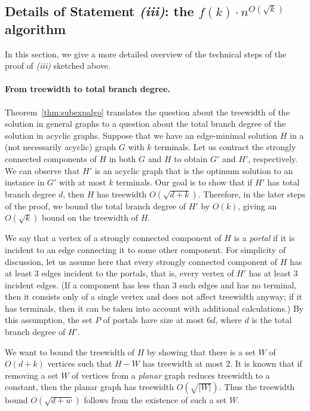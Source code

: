 \documentclass[a4paper,11pt]{article}
\theoremstyle{plain}
\newtheorem{identification rule}{Identification Rule}
\theoremstyle{definition}
\theoremstyle{remark}
\begin{document}
\subsection{Details of Statement \textit{(iii)}: the $f(k) \cdot n^{O(\sqrt{k})}$ algorithm}
In this section, we give a more detailed overview of the technical steps of the proof of \textit{(iii)} sketched above.

  \paragraph{From treewidth to total branch degree.} Theorem~\ref{thm:subexpalgo} translates the question about the treewidth of the solution in general graphs to a question about the total branch degree of the solution in acyclic graphs. Suppose that we have an edge-minimal solution $H$ in a (not necessarily acyclic) graph $G$ with $k$ terminals. Let us contract the strongly connected components of $H$ in both $G$ and $H$ to obtain $G'$ and $H'$, respectively. We can observe that $H'$ is an acyclic graph that is the optimum solution to an instance in $G'$ with at most $k$ terminals. Our goal is to show that if $H'$ has total branch degree $d$, then $H$ has treewidth $O(\sqrt{d+k})$. Therefore, in the later steps of the proof, we bound the total branch degree of $H'$ by $O(k)$, giving an $O(\sqrt{k})$ bound on the treewidth of $H$.

  We say that a vertex of a strongly connected component of $H$ is a \emph{portal} if it is incident to an edge connecting it to some other component.
  For simplicity of discussion, let us assume here that every strongly connected component of $H$ has at least 3 edges incident to the portals, that is, every vertex of $H'$ has at least 3 incident edges. (If a component has less than 3 such edges and has no terminal, then it consists only of a single vertex and does not affect treewidth anyway; if it has terminals, then it can be taken into account with additional calculations.) By this assumption, the set $P$ of portals have size at most $6d$, where $d$ is the total branch degree of $H'$.

  We want to bound the treewidth of $H$ by showing that there is a set $W$ of $O(d+k)$ vertices such that $H-W$ has treewidth at most $2$. It is known that if removing a set $W$ of vertices from a \emph{planar} graph reduces treewidth to a constant, then the planar graph has treewidth $O(\sqrt{|W|})$. Thus the treewidth bound $O(\sqrt{d+w})$ follows from the existence of such a set $W$.
  
\end{document}
